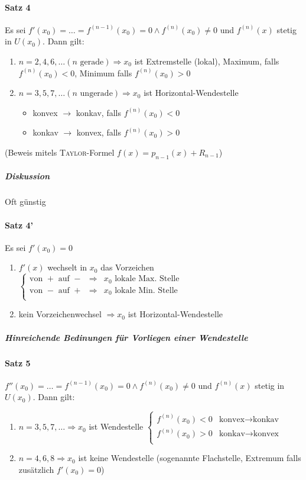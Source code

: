 \documentclass[a4paper]{scrartcl}
\begin{document}
\paragraph{Satz 4} Es sei $f'(x_0) = \dots = f^{(n-1)} (x_0) = 0 \wedge f^{(n)} (x_0) \neq 0$ und $f^{(n)} (x)$ stetig in $U(x_0)$. Dann gilt:
\begin{enumerate}
\item $n=2,4,6,\dots (n \text{ gerade}) \Rightarrow x_0$ ist Extremstelle (lokal), Maximum, falls $f^{(n)} (x_0) < 0$, Minimum falls $f^{(n)}(x_0) > 0$
\item $n=3,5,7, \dots (n \text{ ungerade}) \Rightarrow x_0$ ist Horizontal-Wendestelle
\begin{itemize}
\item konvex $\to$ konkav, falls $f^{(n)} (x_0) <0$
\item konkav $\to$ konvex, falls $f^{(n)} (x_0) >0$
\end{itemize}
\end{enumerate}
(Beweis mitels \textsc{Taylor}-Formel $f(x)= p_{n-1} (x) + R_{n-1}$)

\subparagraph{Diskussion} Oft günstig
\paragraph{Satz 4'} Es sei $f'(x_0) = 0$
\begin{enumerate}
\item $f'(x)$ wechselt in $x_0$ das Vorzeichen\\
$\left\{ \begin{array}{lcr}
\text{von } + \text{ auf } - & \Rightarrow & x_0 \text{ lokale Max. Stelle} \\
\text{von } - \text{ auf } + & \Rightarrow & x_0 \text{ lokale Min. Stelle} \\ \end{array} \right.$
\item kein Vorzeichenwechsel $\Rightarrow x_0$ ist Horizontal-Wendestelle
\end{enumerate}

\subparagraph{Hinreichende Bedinungen für Vorliegen einer Wendestelle}
\paragraph{Satz 5} $f''(x_0) = \dots = f^{(n-1)} (x_0) = 0 \wedge f^{(n)} (x_0) \neq 0$ und $f^{(n)}(x)$ stetig in $U(x_0)$. Dann gilt:
\begin{enumerate}
\item $n=3,5,7,\dots \Rightarrow x_0$ ist Wendestelle $ \left\{ \begin{array}{lr} f^{(n)} (x_0) <0 & \text{konvex} \to \text{konkav} \\
f^{(n)} (x_0) > 0 & \text{konkav} \to \text{konvex}\\ \end{array} \right. $
\item $n=4,6,8 \Rightarrow x_0$ ist keine Wendestelle (sogenannte Flachstelle, Extremum falls zusätzlich $f'(x_0 ) = 0$)
\end{enumerate}
\end{document}
